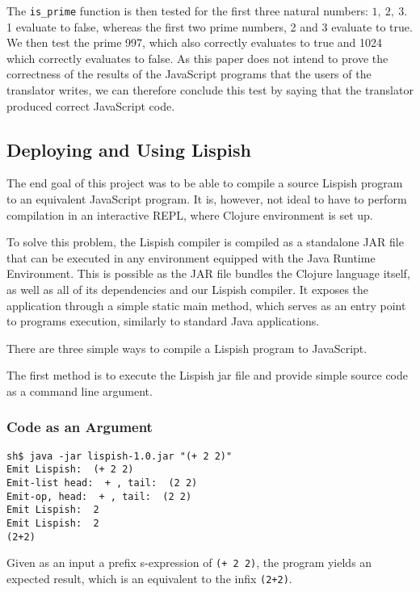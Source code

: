 The \texttt{{is\_prime}} function is then tested for the first three natural numbers: $1, \ 2, \ 3 $. 1 evaluate to false, whereas the first two prime numbers, 2 and 3 evaluate to true. We then test the prime 997, which also correctly evaluates to true and 1024 which correctly evaluates to false. 
As this paper does not intend to prove the correctness of the results of the JavaScript programs that the users of the translator writes, we can therefore conclude this test by saying that the translator produced correct JavaScript code. 

\subsection{Deploying and Using Lispish}\label{deploying-lispish}
The end goal of this project was to be able to compile a source Lispish program to an equivalent JavaScript program.
It is, however, not ideal to have to perform compilation in an interactive REPL, where Clojure environment is set up. 

To solve this problem, the Lispish compiler is compiled as a standalone JAR file that can be executed in any environment equipped with the Java Runtime Environment. This is possible as the JAR file bundles the Clojure language itself, as well as all of its dependencies and our Lispish compiler. It exposes the application through a simple static main method, which serves as an entry point to programs execution, similarly to standard Java applications. 

There are three simple ways to compile a Lispish program to JavaScript. 

The first method is to execute the Lispish jar file and provide simple source code as a command line argument.

\subsubsection{Code as an Argument}

\begin{verbatim}
sh$ java -jar lispish-1.0.jar "(+ 2 2)"
Emit Lispish:  (+ 2 2)
Emit-list head:  + , tail:  (2 2)
Emit-op, head:  + , tail:  (2 2)
Emit Lispish:  2
Emit Lispish:  2
(2+2)
\end{verbatim}

Given as an input a prefix s-expression of \texttt{(+ 2 2)}, the program yields an expected result, which is an equivalent to the infix \texttt{(2+2)}.

